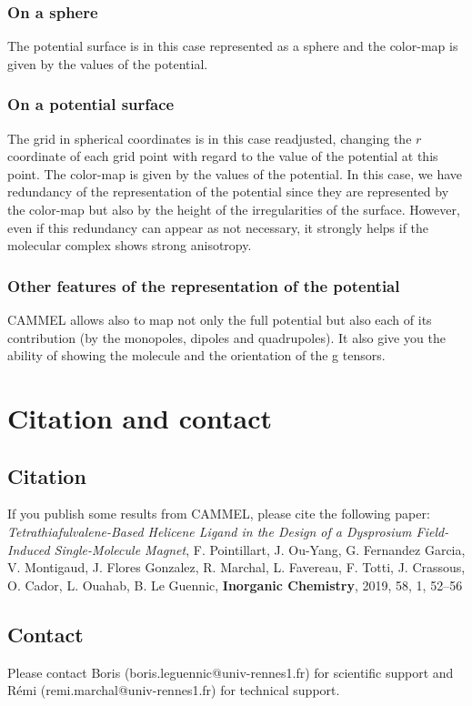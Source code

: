 \documentclass[12pt,a4paper]{article}
\begin{document}
\subsubsection{On a sphere}
The potential surface is in this case represented as a sphere and the color-map is given by the values of the potential.
\subsubsection{On a \og potential surface \fg{}}
The grid in spherical coordinates is in this case readjusted, changing the $r$  coordinate of each grid point with regard to the value of the potential at this point. The color-map is given by the values of the potential. In this case, we have redundancy of the representation of the potential since they are represented by the color-map but also by the height of the irregularities of the surface. However, even if this redundancy can appear as not necessary, it strongly helps if the molecular complex shows strong anisotropy.
\subsubsection{Other features of the representation of the potential}
CAMMEL allows also to map not only the full potential but also each of its contribution (by the monopoles, dipoles and quadrupoles). It also give you the ability of showing the molecule and the orientation of the g tensors.
\section{Citation and contact}
\subsection{Citation}
If you publish some results from CAMMEL, please cite the following paper:\\

\textit{Tetrathiafulvalene-Based Helicene Ligand in the Design of a Dysprosium Field-Induced Single-Molecule Magnet}, F. Pointillart, J. Ou-Yang, G. Fernandez Garcia, V. Montigaud, J. Flores Gonzalez, R. Marchal, L. Favereau, F. Totti, J. Crassous, O. Cador, L. Ouahab, B. Le Guennic, \textbf{Inorganic Chemistry}, 2019, 58, 1, 52–56 


\subsection{Contact}
Please contact Boris (boris.leguennic@univ-rennes1.fr) for scientific support and Rémi (remi.marchal@univ-rennes1.fr) for technical support.
\end{document}
